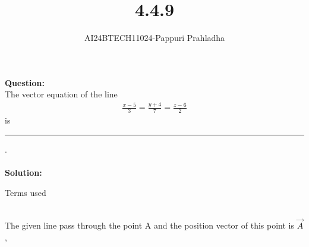 \documentclass[journal]{IEEEtran}
\begin{document}

\vspace{3cm}

\title{4.4.9}
\author{AI24BTECH11024-Pappuri Prahladha}
{\let\newpage\relax\maketitle}

\renewcommand{\thefigure}{\theenumi}
\renewcommand{\thetable}{\theenumi}
\setlength{\intextsep}{10pt} %


\renewcommand{\thetable}{\theenumi}


\textbf{Question:}\\
The vector equation of the line 
\begin{align*}
	\frac{x-5}{3}=\frac{y+4}{7}=\frac{z-6}{2} 
\end{align*}
is \noindent\rule{1cm}{0.1pt}.\\
\\
\textbf{Solution: }\\
\begin{table}[h!]
    \renewcommand{\thetable}{1}
    \centering
    
    \caption{Terms used}
    \label{TABLE 1:}
\end{table}\\

The given line pass through the point A and the position vector of this point is $\vec{A}$,
\end{document}
